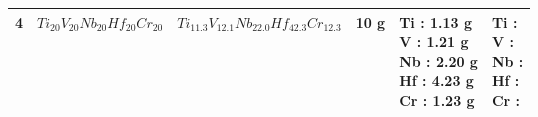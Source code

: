\begin{tabular}{llllll}
4 &  $Ti_{20}V_{20}Nb_{20}Hf_{20}Cr_{20}$ &   $Ti_{11.3}V_{12.1}Nb_{22.0}Hf_{42.3}Cr_{12.3}$ &                           10 g &  \makecell[l]{ Ti : 1.13 g \\ V : 1.21 g \\ Nb : 2.20 g \\ Hf : 4.23 g \\ Cr : 1.23 g \\} &  \makecell[l]{ Ti :\\ V :\\ Nb :\\ Hf :\\ Cr :\\} \\
\bottomrule
\end{tabular}
